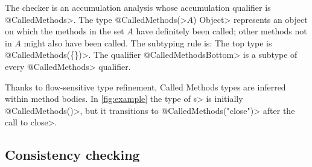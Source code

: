 The checker is an accumulation analysis whose accumulation qualifier is \<@CalledMethods>.
The type \<@CalledMethods(>$A$\<) Object>
represents an object on which the methods in the set $A$ have definitely
been called; other methods not in $A$ might also have been called.
The subtyping
rule is:
The top type is \<@CalledMethods(\{\})>.
The qualifier \<@CalledMethodsBottom> is a subtype of every \<@CalledMethods> qualifier.

Thanks to flow-sensitive type refinement,
Called Methods types are inferred within method bodies.
In \cref{fig:example} the type of \<s> is initially \<@CalledMethods({})>,
but it transitions to \<@CalledMethods("close")> after the call to \<close>.


\subsection{Consistency checking}
\label{sec:must-call-invoked}

